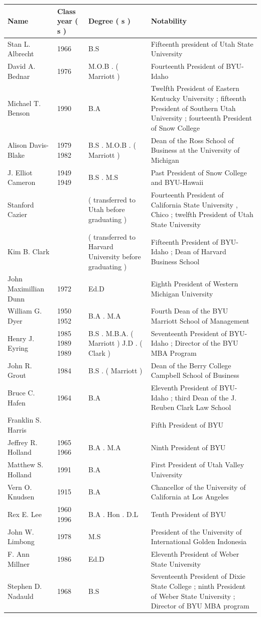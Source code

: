 \documentclass{article}
\begin{document}
\begin{tabular}{llll}
\toprule
Name & Class year ( s ) & Degree ( s ) & Notability \\
\midrule
Stan L. Albrecht & 1966 & B.S & Fifteenth president of Utah State University \\
David A. Bednar & 1976 & M.O.B . ( Marriott ) & Fourteenth President of BYU-Idaho \\
Michael T. Benson & 1990 & B.A & Twelfth President of Eastern Kentucky University ; fifteenth President of Southern Utah University ; fourteenth President of Snow College \\
Alison Davis-Blake & 1979 1982 & B.S . M.O.B . ( Marriott ) & Dean of the Ross School of Business at the University of Michigan \\
J. Elliot Cameron & 1949 1949 & B.S . M.S & Past President of Snow College and BYU-Hawaii \\
Stanford Cazier &  & ( transferred to Utah before graduating ) & Fourteenth President of California State University , Chico ; twelfth President of Utah State University \\
Kim B. Clark &  & ( transferred to Harvard University before graduating ) & Fifteenth President of BYU-Idaho ; Dean of Harvard Business School \\
John Maximillian Dunn & 1972 & Ed.D & Eighth President of Western Michigan University \\
William G. Dyer & 1950 1952 & B.A . M.A & Fourth Dean of the BYU Marriott School of Management \\
Henry J. Eyring & 1985 1989 1989 & B.S . M.B.A. ( Marriott ) J.D . ( Clark ) & Seventeenth President of BYU-Idaho ; Director of the BYU MBA Program \\
John R. Grout & 1984 & B.S . ( Marriott ) & Dean of the Berry College Campbell School of Business \\
Bruce C. Hafen & 1964 & B.A & Eleventh President of BYU-Idaho ; third Dean of the J. Reuben Clark Law School \\
Franklin S. Harris &  &  & Fifth President of BYU \\
Jeffrey R. Holland & 1965 1966 & B.A . M.A & Ninth President of BYU \\
Matthew S. Holland & 1991 & B.A & First President of Utah Valley University \\
Vern O. Knudsen & 1915 & B.A & Chancellor of the University of California at Los Angeles \\
Rex E. Lee & 1960 1996 & B.A . Hon . D.L & Tenth President of BYU \\
John W. Limbong & 1978 & M.S & President of the University of International Golden Indonesia \\
F. Ann Millner & 1986 & Ed.D & Eleventh President of Weber State University \\
Stephen D. Nadauld & 1968 & B.S & Seventeenth President of Dixie State College ; ninth President of Weber State University ; Director of BYU MBA program \\
\bottomrule
\end{tabular}
\end{document}
